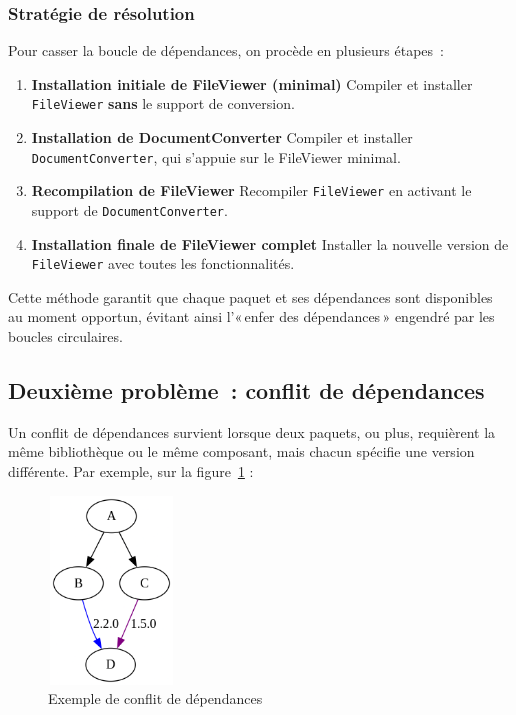 \subsubsection*{Stratégie de résolution}
Pour casser la boucle de dépendances, on procède en plusieurs étapes :
\begin{enumerate}
  \item \textbf{Installation initiale de FileViewer (minimal)}  
    Compiler et installer \texttt{FileViewer} \textbf{sans} le support de conversion.
  \item \textbf{Installation de DocumentConverter}  
    Compiler et installer \texttt{DocumentConverter}, qui s’appuie sur le FileViewer minimal.
  \item \textbf{Recompilation de FileViewer}  
    Recompiler \texttt{FileViewer} en activant le support de \texttt{DocumentConverter}.
  \item \textbf{Installation finale de FileViewer complet}  
    Installer la nouvelle version de \texttt{FileViewer} avec toutes les fonctionnalités.
\end{enumerate}

Cette méthode garantit que chaque paquet et ses dépendances sont disponibles au moment opportun, évitant ainsi l’« enfer des dépendances » engendré par les boucles circulaires. 



\subsection{Deuxième problème : conflit de dépendances}
\label{subsec:dependency-conflict}

Un conflit de dépendances survient lorsque deux paquets, ou plus, requièrent la même bibliothèque ou le même composant, mais chacun spécifie une version différente. Par exemple, sur la figure~\textcolor{blue}{\ref{fig:dependency-conflict}} :

\begin{figure}[H]
  \centering
  \includegraphics[width=0.3\textwidth, height=5cm]{images_pfe/dpendencyconfligt.png}
  \caption{Exemple de conflit de dépendances }
  \label{fig:dependency-conflict}
\end{figure}

